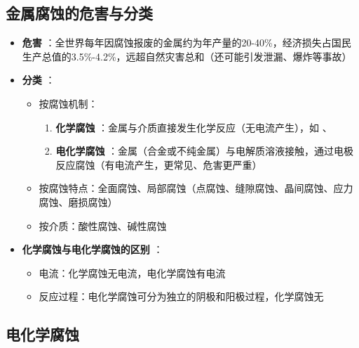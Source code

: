 \subsection{金属腐蚀的危害与分类} 
\begin{itemize} 
    \item \textbf{危害} ：全世界每年因腐蚀报废的金属约为年产量的20-40\%，经济损失占国民生产总值的3.5\%-4.2\%，远超自然灾害总和（还可能引发泄漏、爆炸等事故）
    
    \item \textbf{分类} ：
    \begin{itemize} 
        \item 按腐蚀机制：
        \begin{enumerate} 
            \item \textbf{化学腐蚀} ：金属与介质直接发生化学反应（无电流产生），如  、  
            \item \textbf{电化学腐蚀} ：金属（合金或不纯金属）与电解质溶液接触，通过电极反应腐蚀（有电流产生，更常见、危害更严重）
        \end{enumerate} 
        \item 按腐蚀特点：全面腐蚀、局部腐蚀（点腐蚀、缝隙腐蚀、晶间腐蚀、应力腐蚀、磨损腐蚀）
        \item 按介质：酸性腐蚀、碱性腐蚀
    \end{itemize} 
    
    \item \textbf{化学腐蚀与电化学腐蚀的区别} ：
    \begin{itemize} 
        \item 电流：化学腐蚀无电流，电化学腐蚀有电流
        \item 反应过程：电化学腐蚀可分为独立的阴极和阳极过程，化学腐蚀无
    \end{itemize} 
\end{itemize} 

\subsection{电化学腐蚀} 
